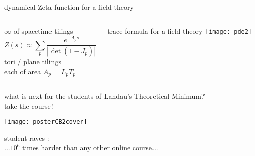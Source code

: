 \begin{frame}{dynamical Zeta function for a field theory}
  \begin{columns}
\begin{block}{$\infty$ of spacetime tilings}
\[
Z(s) \approx
\sum_{p} \frac{e^{-A_p s}}
              {\left|\det(1-J_p)\right|}
\]
tori / plane tilings
\\
each of area $A_p = L_p T_p$
\end{block}
\begin{block}{trace formula  for a field theory}
\texttt{[image: pde2]}%
\end{block}
  \end{columns}
\end{frame}

\begin{frame}{what is next for the students of Landau's Theoretical Minimum?
\\
take the course!}
\begin{center}
\texttt{[image: posterCB2cover]}
\end{center}
\vfill
student raves : \\
...$10^6$ times harder than any other online course...
\end{frame}


